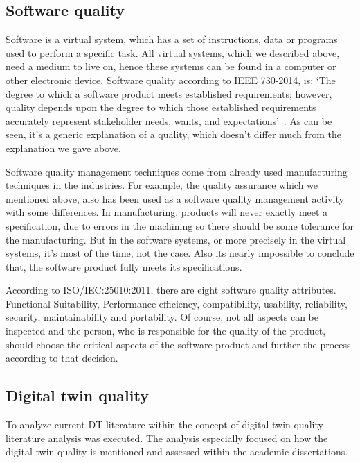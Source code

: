 \documentclass[9pt,conference]{IEEEtran}
\begin{document}
    \subsection{Software quality}
    Software is a  virtual system, which has a set of instructions, data or programs used to perform a specific task. 
    All virtual systems, which we described above, need a medium to live on, hence these systems can be found in a computer or other electronic device.  
    Software quality according to IEEE 730-2014, is: 
    `The degree to which a software product meets established requirements; however, 
    quality depends upon the degree to which those established requirements accurately represent stakeholder needs, wants, and expectations'~\cite{IEE730-2014}. 
    As can be seen, it's a generic explanation of a quality, which doesn't differ much from the explanation we gave above. 

    Software quality management techniques come from already used manufacturing techniques in the industries.
    For example, the quality assurance which we mentioned above, also has been used as a software quality management activity with some differences. 
    In manufacturing, products will never exactly meet a specification, due to errors in the machining so there should be some tolerance for the manufacturing. 
    But in the software systems, or more precisely in the virtual systems, it's most of the time, not the case. 
    Also its nearly impossible to conclude that, the software product fully meets its specifications\cite{SoftwareEngineering}.

    According to ISO/IEC:25010:2011, there are eight software quality attributes. Functional Suitability, 
    Performance efficiency, compatibility, usability, reliability, security, maintainability and portability.\cite{ISO/IEC:25010}
    Of course, not all aspects can be inspected and the person, who is responsible for the quality of the product, should choose the critical aspects of the software product and further the process according to that decision.

    \subsection{Digital twin quality}
    To analyze current DT literature within the concept of digital twin quality literature analysis was executed. 
    The analysis especially focused on how the digital twin quality is mentioned and assessed within the academic dissertations.
\end{document}
